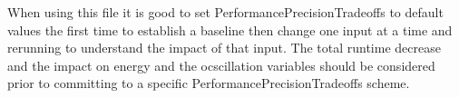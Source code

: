 When using this file it is good to set PerformancePrecisionTradeoffs to default values the first time to establish a baseline then change one input at a time and rerunning to understand the impact of that input. The total runtime decrease 
and the impact on energy and the ocscillation variables should be considered prior to committing to a specific PerformancePrecisionTradeoffs scheme.

